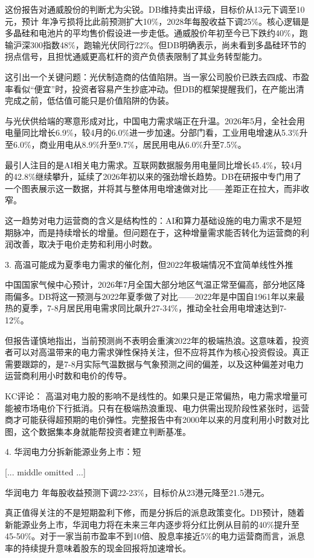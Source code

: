 \documentclass[11pt]{ctexart}
\begin{document}
这份报告对通威股份的判断尤为尖锐。DB维持卖出评级，目标价从13元下调至10元，预计 年净亏损将比此前预测扩大10\%，2028年每股收益下调25\%。核心逻辑是多晶硅和电池片的平均售价假设进一步走低。通威股价年初至今已下跌约40\%，跑输沪深300指数48\%，跑输光伏同行22\%。但DB明确表示，尚未看到多晶硅环节的拐点信号，且担忧通威更高杠杆的资产负债表限制了其业务转型能力。

这引出一个关键问题：光伏制造商的估值陷阱。当一家公司股价已跌去四成、市盈率看似“便宜”时，投资者容易产生抄底冲动。但DB的框架提醒我们，在产能出清完成之前，低估值可能只是价值陷阱的伪装。

与光伏供给端的寒意形成对比，中国电力需求端正在升温。2026年5月，全社会用电量同比增长6.9\%，较4月的6.0\%进一步加速。分部门看，工业用电增速从5.3\%升至6.0\%，商业用电从8.9\%升至9.7\%，居民用电从6.0\%升至7.5\%。

最引人注目的是AI相关电力需求。互联网数据服务用电量同比增长45.4\%，较4月的42.8\%继续攀升，延续了2026年初以来的强劲增长趋势。DB在研报中专门用了一个图表展示这一数据，并将其与整体用电增速做对比——差距正在拉大，而非收窄。

这一趋势对电力运营商的含义是结构性的：AI和算力基础设施的电力需求不是短期脉冲，而是持续增长的增量。但问题在于，这种增量需求能否转化为运营商的利润改善，取决于电价走势和利用小时数。

3. 高温可能成为夏季电力需求的催化剂，但2022年极端情况不宜简单线性外推

中国国家气候中心预计，2026年7月全国大部分地区气温正常至偏高，部分地区降雨偏多。DB将这一预测与2022年夏季做了对比——2022年是中国自1961年以来最热的夏季，7-8月居民用电需求同比飙升27-34\%，推动全社会用电增速达到7-12\%。

但报告谨慎地指出，当前预测尚不表明会重演2022年的极端热浪。这意味着，投资者可以对高温带来的电力需求弹性保持关注，但不应将其作为核心投资假设。真正需要跟踪的，是7-8月实际气温数据与气象预测之间的偏差，以及这种偏差对电力运营商利用小时数和电价的传导。

KC评论： 高温对电力股的影响不是线性的。如果只是正常偏热，电力需求增量可能被市场电价下行抵消。只有在极端热浪重现、电力供需出现阶段性紧张时，运营商才可能获得超预期的电价弹性。完整报告中有2000年以来的月度利用小时数对比图，这个数据集本身就能帮投资者建立判断基准。

4. 华润电力分拆新能源业务上市：短

[... middle omitted ...]

华润电力 年每股收益预测下调22-23\%，目标价从23港元降至21.5港元。

真正值得关注的不是短期盈利下修，而是分拆后的派息政策变化。DB预计，随着新能源业务上市，华润电力将在未来三年内逐步将分红比例从目前的40\%提升至45-50\%。对于一家当前市盈率不到10倍、股息率接近5\%的电力运营商而言，派息率的持续提升意味着股东的现金回报将加速增长。
\end{document}
